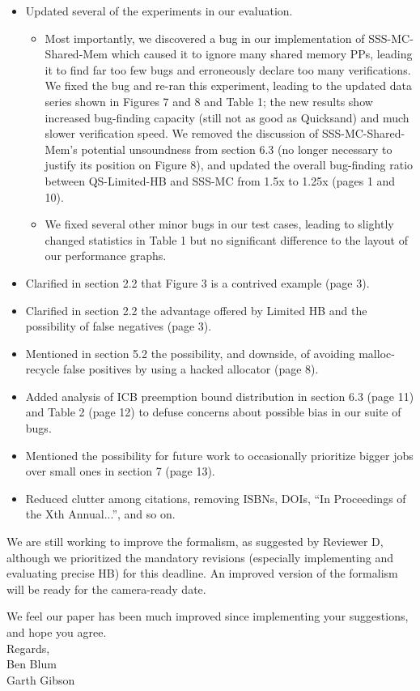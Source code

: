 \documentclass{article}
\begin{document}
\begin{itemize}
	\item Updated several of the experiments in our evaluation.
		\begin{itemize}
			\item Most importantly, we discovered a bug in our implementation of SSS-MC-Shared-Mem which caused it to ignore many shared memory PPs, leading it to find far too few bugs and erroneously declare too many verifications.
		We fixed the bug and re-ran this experiment, leading to the updated data series shown in Figures 7 and 8 and Table 1;
		the new results show increased bug-finding capacity (still not as good as Quicksand) and much slower verification speed.
		We removed the discussion of SSS-MC-Shared-Mem's potential unsoundness from section 6.3 (no longer necessary to justify its position on Figure 8),
		and updated the overall bug-finding ratio between QS-Limited-HB and SSS-MC from 1.5x to 1.25x (pages 1 and 10).
			\item We fixed several other minor bugs in our test cases, leading to slightly changed statistics in Table 1 but no significant difference to the layout of our performance graphs.
		\end{itemize}
	\item Clarified in section 2.2 that Figure 3 is a contrived example (page 3).
	\item Clarified in section 2.2 the advantage offered by Limited HB and the possibility of false negatives (page 3).
	\item Mentioned in section 5.2 the possibility, and downside, of avoiding malloc-recycle false positives by using a hacked allocator (page 8).
	\item Added analysis of ICB preemption bound distribution in section 6.3 (page 11) and Table 2 (page 12) to defuse concerns about possible bias in our suite of bugs.
	\item Mentioned the possibility for future work to occasionally prioritize bigger jobs over small ones in section 7 (page 13).
	\item Reduced clutter among citations, removing ISBNs, DOIs, ``In Proceedings of the Xth Annual...'', and so on.
\end{itemize}

We are still working to improve the formalism, as suggested by Reviewer D,
although we prioritized the mandatory revisions (especially implementing and evaluating precise HB) for this deadline.
An improved version of the formalism will be ready for the camera-ready date.

We feel our paper has been much improved since implementing your suggestions, and hope you agree.
\\

\noindent Regards,
\\

\noindent Ben Blum \\
Garth Gibson
\thispagestyle{empty}
\end{document}

